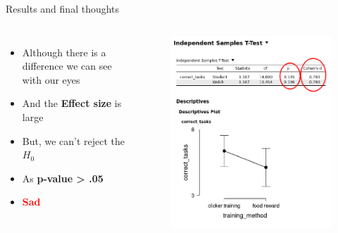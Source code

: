 \documentclass[8pt]{beamer}
\begin{document}
        \begin{frame}{Results and final thoughts}
            \begin{columns}
                \begin{itemize}
                    \item Although there is a difference we can see with our eyes
                    \item And the \textbf{Effect size} is large
                    \item But, we can't reject the $H_0$
                    \item As \textbf{p-value > .05}
                    \item \textcolor{red}{\textbf{Sad}}
                \end{itemize}
                \begin{figure}
                    \includegraphics[width=.95\textwidth]{images/indep result.png}
                    \vspace{.25cm}
                \end{figure}
            \end{columns}
        \end{frame}
    
\end{document}
